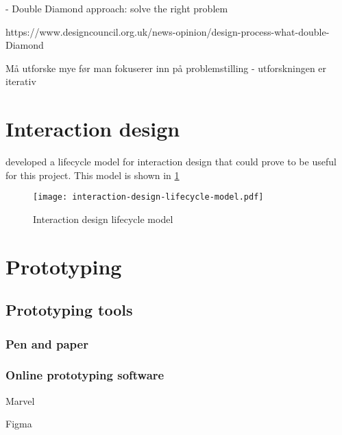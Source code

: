 - Double Diamond approach: solve the right problem

https://www.designcouncil.org.uk/news-opinion/design-process-what-double-Diamond

Må utforske mye før man fokuserer inn på problemstilling - utforskningen er iterativ

\section{Interaction design}
\label{sec:interactiondesign}

\textcite{preece2015} developed a lifecycle model for interaction design that could prove to be useful for this project. This model is shown in \ref{fig:interactiondesign}

\begin{figure}
    \centering
    \texttt{[image: interaction-design-lifecycle-model.pdf]}
    \caption{Interaction design lifecycle model}
    \label{fig:interactiondesign}
\end{figure}

\section{Prototyping}
\label{sec:prototyping}

\subsection{Prototyping tools}

\subsubsection{Pen and paper}

\subsubsection{Online prototyping software}

Marvel

Figma
